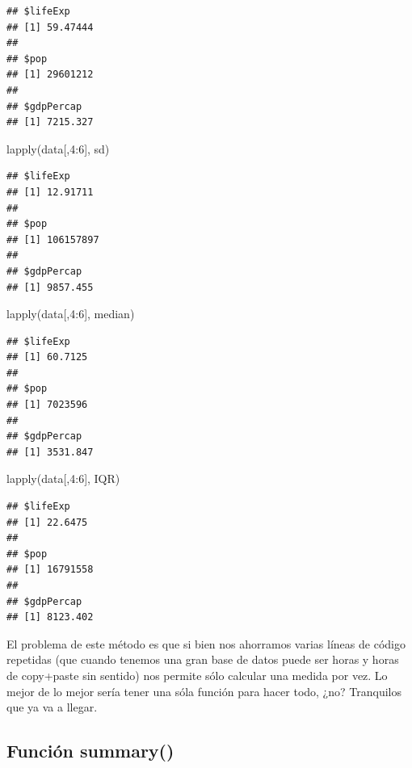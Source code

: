 \documentclass[
]{book}
\newenvironment{Shaded}{\begin{snugshade}}{\end{snugshade}}
\newcommand{\DecValTok}[1]{\textcolor[rgb]{0.00,0.00,0.81}{#1}}
\newcommand{\FunctionTok}[1]{\textcolor[rgb]{0.00,0.00,0.00}{#1}}
\newcommand{\NormalTok}[1]{#1}
\newcommand{\SpecialCharTok}[1]{\textcolor[rgb]{0.00,0.00,0.00}{#1}}
\begin{document}
\begin{verbatim}
## $lifeExp
## [1] 59.47444
## 
## $pop
## [1] 29601212
## 
## $gdpPercap
## [1] 7215.327
\end{verbatim}

\begin{Shaded}
\begin{Highlighting}[]
\FunctionTok{lapply}\NormalTok{(data[,}\DecValTok{4}\SpecialCharTok{:}\DecValTok{6}\NormalTok{], sd)}
\end{Highlighting}
\end{Shaded}

\begin{verbatim}
## $lifeExp
## [1] 12.91711
## 
## $pop
## [1] 106157897
## 
## $gdpPercap
## [1] 9857.455
\end{verbatim}

\begin{Shaded}
\begin{Highlighting}[]
\FunctionTok{lapply}\NormalTok{(data[,}\DecValTok{4}\SpecialCharTok{:}\DecValTok{6}\NormalTok{], median)}
\end{Highlighting}
\end{Shaded}

\begin{verbatim}
## $lifeExp
## [1] 60.7125
## 
## $pop
## [1] 7023596
## 
## $gdpPercap
## [1] 3531.847
\end{verbatim}

\begin{Shaded}
\begin{Highlighting}[]
\FunctionTok{lapply}\NormalTok{(data[,}\DecValTok{4}\SpecialCharTok{:}\DecValTok{6}\NormalTok{], IQR)}
\end{Highlighting}
\end{Shaded}

\begin{verbatim}
## $lifeExp
## [1] 22.6475
## 
## $pop
## [1] 16791558
## 
## $gdpPercap
## [1] 8123.402
\end{verbatim}

El problema de este método es que si bien nos ahorramos varias líneas de código repetidas (que cuando tenemos una gran base de datos puede ser horas y horas de copy+paste sin sentido) nos permite sólo calcular una medida por vez. Lo mejor de lo mejor sería tener una sóla función para hacer todo, ¿no? Tranquilos que ya va a llegar.

\hypertarget{funciuxf3n-summary}{%
\subsection{Función summary()}\label{funciuxf3n-summary}}
\end{document}
